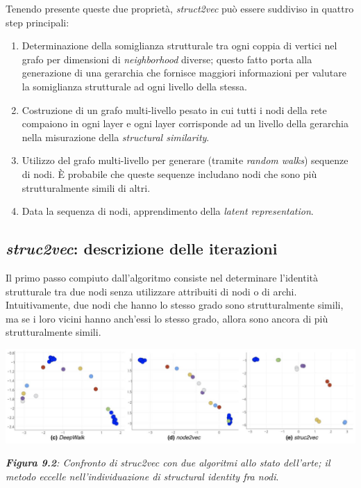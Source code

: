 \documentclass[11pt]{article}
\begin{document}
Tenendo presente queste due proprietà, \textit{struct2vec} può essere suddiviso in quattro step principali:
\begin{enumerate}
\setlength{\itemsep}{1pt}
  \setlength{\parskip}{0pt}
  \setlength{\parsep}{0pt}
  \item Determinazione della somiglianza strutturale tra ogni coppia di vertici nel grafo per dimensioni di \textit{neighborhood} diverse; questo fatto porta alla generazione di una gerarchia che fornisce maggiori informazioni per valutare la somiglianza strutturale ad ogni livello della stessa.
  \item Costruzione di un grafo multi-livello pesato in cui tutti i nodi della rete compaiono in ogni layer e ogni layer corrisponde ad un livello della gerarchia nella misurazione della \textit{structural similarity}.
  \item Utilizzo del grafo multi-livello per generare (tramite \textit{random walks}) sequenze di nodi. È probabile che queste sequenze includano nodi che sono più strutturalmente simili di altri.
  \item Data la sequenza di nodi, apprendimento della \textit{latent representation}.
\end{enumerate}

\subsection{\textit{struc2vec}: descrizione delle iterazioni}
Il primo passo compiuto dall'algoritmo consiste nel determinare l'identità strutturale tra due nodi senza utilizzare attribuiti di nodi o di archi. Intuitivamente, due nodi che hanno lo stesso grado sono strutturalmente simili, ma se i loro vicini hanno anch'essi lo stesso grado, allora sono ancora di più strutturalmente simili.\\

\begin{center}
\includegraphics[scale=0.4]{struc2}

\begin{small}\textit{\textbf{Figura 9.2}: Confronto di struc2vec con due algoritmi allo stato dell'arte; il metodo eccelle nell'individuazione di structural identity fra nodi}.\end{small}
\end{center}
\end{document}
